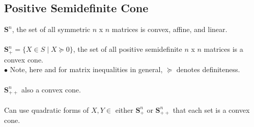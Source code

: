 \documentclass[]{article}
\begin{document}
\subsection*{Positive Semidefinite Cone}
$\boldsymbol{S}^{n}$, the set of all symmetric $n$ x $n$ matrices is convex, affine, and linear. \\\\
$\boldsymbol{S}^{n}_{+} = \{X \in S \mid X \succeq 0\}$, the set of all positive semidefinite $n$ x $n$ matrices is a convex cone. \\
$\bullet$ Note, here and for matrix inequalities in general, $\succeq$ denotes definiteness. \\\\
$\boldsymbol{S}^{n}_{++}$ also a convex cone. \\\\
Can use quadratic forms of $X,Y \in$ either $\boldsymbol{S}^{n}_{+}$ or $\boldsymbol{S}^{n}_{++}$ that each set is a convex cone. \\





	
\end{document}
